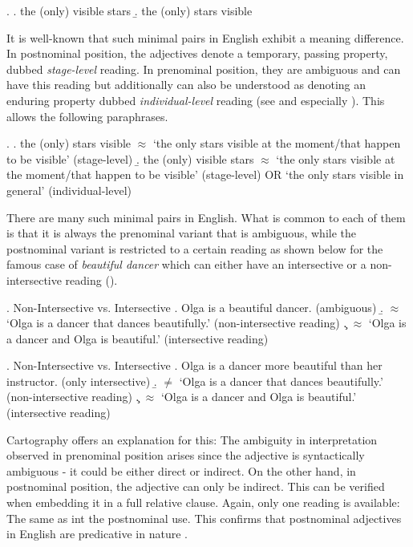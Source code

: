 \documentclass [output=book,colorlinks,citecolor=brown]{langscibook}
\begin{document}
\ex. \a. the (only) visible stars
\b. the (only) stars visible

It is well-known that such minimal pairs in English exhibit a meaning difference. In postnominal position, the adjectives denote a temporary, passing property, dubbed \textit{stage-level} reading. In prenominal position, they are ambiguous and can have this reading but additionally can also be understood as denoting an enduring property dubbed \textit{individual-level} reading (see \citealt{sadler:1994:prenominal, larson:1998:events, larson:2004:indefinite} and especially \citealt[Chapter 2.1]{cinque:2010:adj}). This allows the following paraphrases. %

\ex. \a. the (only) stars visible $\approx$ `the only stars visible at the moment/that happen to be visible' (stage-level)
\b. the (only) visible stars $\approx$ `the only stars visible at the moment/that happen to be visible' (stage-level) OR `the only stars visible in general' (individual-level)

There are many such minimal pairs in English. What is common to each of them is that it is always the prenominal variant that is ambiguous, while the postnominal variant is restricted to a certain reading as shown below for the famous case of \textit{beautiful dancer} which can either have an intersective or a non-intersective reading (\citealt{larson:2000:acd, vendler:1957:verbs, siegel:1976:capturing, larson:1995:olga}). %

\ex. \label{ambiguous, beautiful} Non-Intersective vs. Intersective \citep[145]{larson:1995:olga}
\a. Olga is a beautiful dancer. (ambiguous) \label{olga}
\b. $\approx$ `Olga is a dancer that dances beautifully.’ (non-intersective reading)
\c. $\approx$ `Olga is a dancer and Olga is beautiful.’ (intersective reading)

\ex. Non-Intersective vs. Intersective \citep[9]{cinque:2010:adj}
\a. Olga is a dancer more beautiful than her instructor. (only intersective)
\b. $\neq$ `Olga is a dancer that dances beautifully.’ (non-intersective reading)
\c. $\approx$ `Olga is a dancer and Olga is beautiful.’ (intersective reading) \label{intersective, RC}

Cartography offers an explanation for this: The ambiguity in interpretation observed in prenominal position arises since the adjective is syntactically ambiguous - it could be either direct or indirect. On the other hand, in postnominal position, the adjective can only be indirect. This can be verified when embedding it in a full relative clause. Again, only one reading is available: The same as int the postnominal use. This confirms that postnominal adjectives in English are predicative in nature \citep[18–19]{cinque:2010:adj}. %
\end{document}
